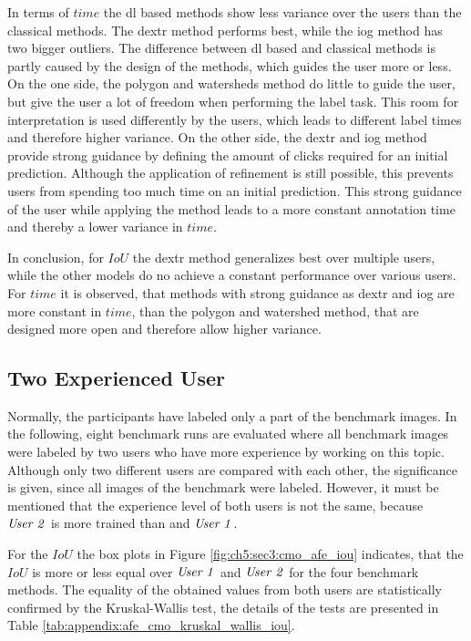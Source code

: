 In terms of $ time $ the \gls{dl} based methods show less variance over the users than the classical methods.
The \gls{dextr} method performs best, while the \gls{iog} method has two bigger outliers.
The difference between \gls{dl} based and classical methods is partly caused by the design of the methods, which guides the user more or less.
On the one side, the polygon and watersheds method do little to guide the user,
but give the user a lot of freedom when performing the label task.
This room for interpretation is used differently by the users, which leads to different label times and therefore higher variance.
On the other side, the \gls{dextr} and \gls{iog} method provide strong guidance by defining the amount of clicks required for an initial prediction.
Although the application of refinement is still possible, this prevents users from spending too much time on an initial prediction.
This strong guidance of the user while applying the method leads to a more constant annotation time and thereby a lower variance in $ time $.

In conclusion, for $IoU$ the \gls{dextr} method generalizes best over multiple users, while the other models do no achieve a constant performance over various users.
For $ time $ it is observed, that methods with strong guidance as \gls{dextr} and \gls{iog} are more constant in $ time $, than the polygon and watershed method, that are designed more open and therefore allow higher variance.


\subsection{Two Experienced User} \label{ord:ch5:sec3:subsec2_cmo_afe}

Normally, the participants have labeled only a part of the benchmark images. 
In the following, eight benchmark runs are evaluated where all benchmark images were labeled by two users who have more experience by working on this topic.
Although only two different users are compared with each other, the significance is given, since all images of the benchmark were labeled.
However, it must be mentioned that the experience level of both users is not the same, because $ \textnormal{\textit{User 2}} $ is more trained than and $ \textnormal{\textit{User 1}} $.

For the $ IoU $ the box plots in Figure \ref{fig:ch5:sec3:cmo_afe_iou} indicates, that the $ IoU $ is more or less equal over $ \textnormal{\textit{User 1}} $ and $ \textnormal{\textit{User 2}} $ for the four benchmark methods.
The equality of the obtained values from both users are statistically confirmed by the Kruskal-Wallis test, the details of the tests are presented in Table \ref{tab:appendix:afe_cmo_kruskal_wallis_iou}.

